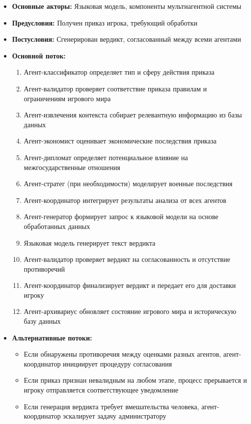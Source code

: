 \begin{itemize}
    \item \textbf{Основные акторы:} Языковая модель, компоненты мультиагентной системы
    \item \textbf{Предусловия:} Получен приказ игрока, требующий обработки
    \item \textbf{Постусловия:} Сгенерирован вердикт, согласованный между всеми агентами
    \item \textbf{Основной поток:}
    \begin{enumerate}
        \item Агент-классификатор определяет тип и сферу действия приказа
        \item Агент-валидатор проверяет соответствие приказа правилам и ограничениям игрового мира
        \item Агент-извлечения контекста собирает релевантную информацию из базы данных
        \item Агент-экономист оценивает экономические последствия приказа
        \item Агент-дипломат определяет потенциальное влияние на межгосударственные отношения
        \item Агент-стратег (при необходимости) моделирует военные последствия
        \item Агент-координатор интегрирует результаты анализа от всех агентов
        \item Агент-генератор формирует запрос к языковой модели на основе обработанных данных
        \item Языковая модель генерирует текст вердикта
        \item Агент-валидатор проверяет вердикт на согласованность и отсутствие противоречий
        \item Агент-координатор финализирует вердикт и передает его для доставки игроку
        \item Агент-архивариус обновляет состояние игрового мира и историческую базу данных
    \end{enumerate}
    \item \textbf{Альтернативные потоки:}
    \begin{itemize}
        \item Если обнаружены противоречия между оценками разных агентов, агент-координатор инициирует процедуру согласования
        \item Если приказ признан невалидным на любом этапе, процесс прерывается и игроку отправляется соответствующее уведомление
        \item Если генерация вердикта требует вмешательства человека, агент-координатор эскалирует задачу администратору
    \end{itemize}
\end{itemize}

